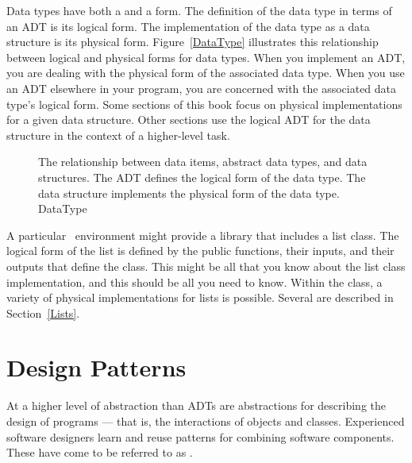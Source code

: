 Data types have both a  and a  form.
The definition of the data type in terms of an ADT is its logical
form.
The implementation of the data type as a data structure
is its physical form.
Figure~\ref{DataType} illustrates this relationship between logical
and physical forms for data types.
When you implement an ADT, you are dealing with the physical form of
the associated data type.
When you use an ADT elsewhere in your program, you are concerned with
the associated data type's logical form.
Some sections of this book focus on physical
implementations for a given data structure.
Other sections use the logical ADT for the data structure in the
context of a higher-level task.

\begin{figure}

{The relationship between data items, abstract data types, and data
structures.
The ADT defines the logical form of the data type.
The data structure implements the physical form of the data type.} 
{DataType}
\bigskip
\end{figure}

\begin{example}
A particular \Lang\ environment might provide a library that includes a
list class.
The logical form of the list is defined by the public 
functions, their inputs, and their outputs that define the class.
This might be all that you know about the list class implementation,
and this should be all you need to know.
Within the class, a variety of physical implementations for lists
is possible.
Several are described in Section~\ref{Lists}.
\end{example}

\section{Design Patterns}
\label{DesPatt}

At a higher level of abstraction than ADTs
are abstractions for describing the design of programs --- that is, the
interactions of objects and classes.
Experienced software designers learn and reuse patterns
for combining software components.
These have come to be referred to as .

